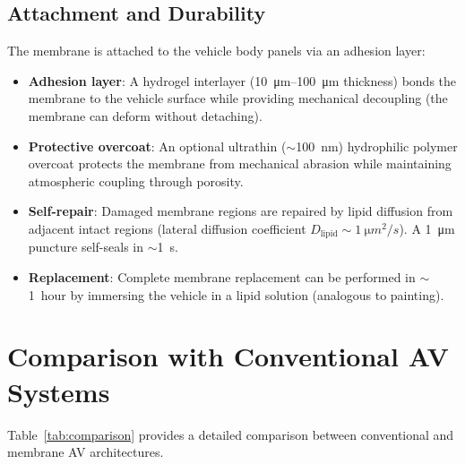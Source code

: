 \documentclass[12pt]{article}
\theoremstyle{definition}
\theoremstyle{remark}
\begin{document}
\subsection{Attachment and Durability}

The membrane is attached to the vehicle body panels via an adhesion layer:
\begin{itemize}
  \item \textbf{Adhesion layer}: A hydrogel interlayer (\SI{10}{\micro m}--\SI{100}{\micro m} thickness) bonds the membrane to the vehicle surface while providing mechanical decoupling (the membrane can deform without detaching).
  \item \textbf{Protective overcoat}: An optional ultrathin ($\sim$\SI{100}{nm}) hydrophilic polymer overcoat protects the membrane from mechanical abrasion while maintaining atmospheric coupling through porosity.
  \item \textbf{Self-repair}: Damaged membrane regions are repaired by lipid diffusion from adjacent intact regions (lateral diffusion coefficient $D_{\mathrm{lipid}} \sim \SI{1}{\micro m^2/s}$). A \SI{1}{\micro m} puncture self-seals in $\sim$\SI{1}{s}.
  \item \textbf{Replacement}: Complete membrane replacement can be performed in $\sim$\SI{1}{hour} by immersing the vehicle in a lipid solution (analogous to painting).
\end{itemize}


\section{Comparison with Conventional AV Systems}
\label{sec:comparison}

Table~\ref{tab:comparison} provides a detailed comparison between conventional and membrane AV architectures.
\end{document}
